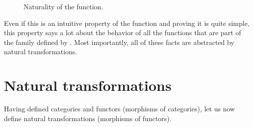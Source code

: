 \begin{figure}[htb]
  \begin{center}
  \end{center}
  \caption{Naturality of the  function.}
  \label{fig:naturality-head-haskell}
\end{figure}

Even if this is an intuitive property of the 
function and proving it is quite simple, this property says a lot
about the behavior of all the functions that are part of the family
defined by . Most importantly, all of these facts
are abstracted by natural transformations.

\section{Natural transformations}
\label{sec:naturals}

Having defined categories and functors (morphisms of categories), let
us now define natural transformations (morphisms of functors).

